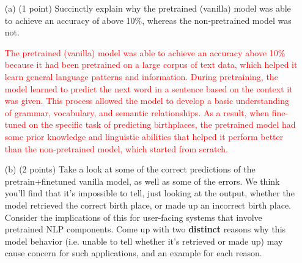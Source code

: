 \documentclass[letterpaper,12pt]{article}
\begin{document}
	\begin{itemize}
		\item[(a)]
			(1 point) Succinctly explain why the pretrained (vanilla) model was able to achieve an accuracy of above 10\%, whereas the non-pretrained model was not.
			
			\textcolor{red}{ The pretrained (vanilla) model was able to achieve an accuracy above 10\% because it had been pretrained on a large corpus of text data, which helped it learn general language patterns and information. During pretraining, the model learned to predict the next word in a sentence based on the context it was given. This process allowed the model to develop a basic understanding of grammar, vocabulary, and semantic relationships. As a result, when fine-tuned on the specific task of predicting birthplaces, the pretrained model had some prior knowledge and linguistic abilities that helped it perform better than the non-pretrained model, which started from scratch.}
		\item[(b)]
			(2 points) Take a look at some of the correct predictions of the pretrain+finetuned vanilla model, as well as some of the errors. We think you'll find that it's impossible to tell, just looking at the output, whether the model retrieved the correct birth place, or made up an incorrect birth place. Consider the implications of this for user-facing systems that involve pretrained NLP components. Come up with two \textbf{distinct} reasons why this model behavior (i.e. unable to tell whether it's retrieved or made up) may cause concern for such applications, and an example for each reason.
			

\end{itemize}
\end{document}
